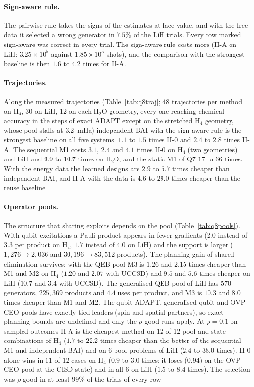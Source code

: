 \documentclass[aps,pra,reprint,superscriptaddress,nofootinbib]{revtex4-2}
\begin{document}
\paragraph{Sign-aware rule.} The pairwise rule takes the signs of the estimates at face value, and with the free data it selected a wrong generator in $7.5\%$ of the LiH trials. Every row marked sign-aware was correct in every trial. The sign-aware rule costs more (II-A on LiH: $3.25\times10^{5}$ against $1.85\times10^{5}$ shots), and the comparison with the strongest baseline is then $1.6$ to $4.2$ times for II-A.

\paragraph{Trajectories.} Along the measured trajectories (Table~\ref{tab:q8traj}; 48 trajectories per method on H$_4$, 30 on LiH, 12 on each H$_2$O geometry, every one reaching chemical accuracy in the steps of exact ADAPT except on the stretched H$_4$ geometry, whose pool stalls at 3.2~mHa) independent BAI with the sign-aware rule is the strongest baseline on all five systems, $1.1$ to $1.5$ times II-0 and $2.4$ to $2.8$ times II-A. The sequential M1 costs $3.1$, $2.4$ and $4.1$ times II-0 on H$_4$ (two geometries) and LiH and $9.9$ to $10.7$ times on H$_2$O, and the static M1 of Q7 $17$ to $66$ times. With the energy data the learned designs are $2.9$ to $5.7$ times cheaper than independent BAI, and II-A with the data is $4.6$ to $29.0$ times cheaper than the reuse baseline.

\paragraph{Operator pools.} The structure that sharing exploits depends on the pool (Table~\ref{tab:q8pools}). With qubit excitations a Pauli product appears in fewer gradients ($2.0$ instead of $3.3$ per product on H$_4$, $1.7$ instead of $4.0$ on LiH) and the support is larger ($1{,}276\to2{,}036$ and $30{,}196\to83{,}512$ products). The planning gain of shared elimination survives: with the QEB pool M3 is $1.26$ and $2.15$ times cheaper than M1 and M2 on H$_4$ ($1.20$ and $2.07$ with UCCSD) and $9.5$ and $5.6$ times cheaper on LiH ($10.7$ and $3.4$ with UCCSD). The generalised QEB pool of LiH has $570$ generators, $225{,}369$ products and $4.4$ uses per product, and M3 is $10.3$ and $8.0$ times cheaper than M1 and M2. The qubit-ADAPT, generalised qubit and OVP-CEO pools have exactly tied leaders (spin and spatial partners), so exact planning bounds are undefined and only the $\rho$-good runs apply. At $\rho=0.1$ on sampled outcomes II-A is the cheapest method on 12 of 12 pool and state combinations of H$_4$ ($1.7$ to $22.2$ times cheaper than the better of the sequential M1 and independent BAI) and on 6 pool problems of LiH ($2.4$ to $38.0$ times). II-0 alone wins in $11$ of 12 cases on H$_4$ ($0.9$ to $3.0$ times; it loses (0.94) on the OVP-CEO pool at the CISD state) and in all 6 on LiH ($1.5$ to $8.4$ times). The selection was $\rho$-good in at least $99\%$ of the trials of every row.
\end{document}
